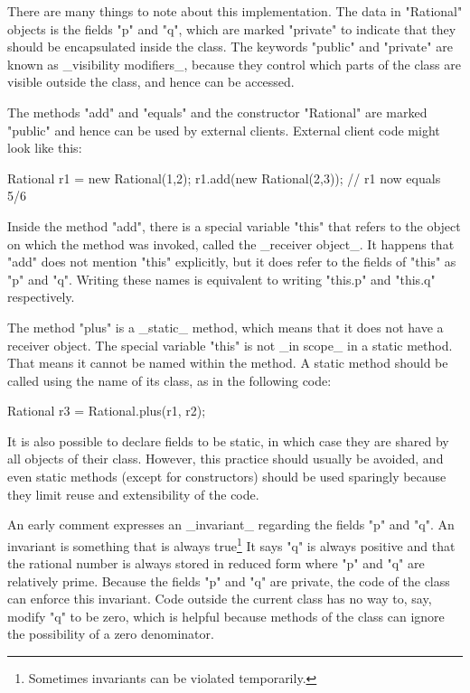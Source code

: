 \documentclass{article}
\begin{document}
There are many things to note about this implementation. The data in
"Rational" objects is the fields "p" and "q", which are marked
"private" to indicate that they should be encapsulated inside the
class. The keywords "public" and "private" are known as _visibility
modifiers_, because they control which parts of the class are visible
outside the class, and hence can be accessed.

The methods "add" and "equals" and the constructor "Rational" are marked "public"
and hence can be used by external clients. External client code might
look like this:

\begin{code}
Rational r1 = new Rational(1,2);
r1.add(new Rational(2,3));
// r1 now equals 5/6
\end{code}

Inside the method "add", there is a special variable "this" that
refers to the object on which the method was invoked, called the
_receiver object_. It happens that "add" does not mention "this"
explicitly, but it does refer to the fields of "this" as "p" and "q".
Writing these names is equivalent to writing "this.p" and "this.q"
respectively.

The method "plus" is a _static_ method, which means that it does not
have a receiver object. The special variable "this" is not _in scope_
in a static method. That means it cannot be named within the method. A
static method should be called using the name of its class, as in the
following code:

\begin{code}
Rational r3 = Rational.plus(r1, r2);
\end{code}

\noindent It is also possible to declare fields to be static, in which
case they are shared by all objects of their class. However, this
practice should usually be avoided, and even static methods
(except for constructors) should be used sparingly because they limit
reuse and extensibility of the code.

An early comment expresses an _invariant_ regarding the fields "p" and
"q".  An invariant is something that is always true\footnote{Sometimes
invariants can be violated temporarily.} It says "q" is always
positive and that the rational number is always stored in reduced form
where "p" and "q" are relatively prime. Because the fields "p" and "q"
are private, the code of the class can enforce this invariant. Code
outside the current class has no way to, say, modify "q" to be zero,
which is helpful because methods of the class can ignore the
possibility of a zero denominator.
\end{document}
